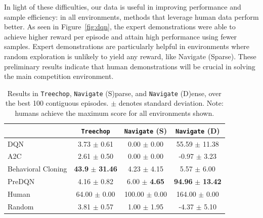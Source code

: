 In light of these difficulties, our data is useful in improving performance and sample efficiency:
in all environments, methods that leverage human data perform better.
As seen in Figure~\ref{fig:dqn}, the expert demonstrations were able to achieve higher
reward per episode and attain high performance using fewer samples.
Expert demonstrations are particularly helpful in environments where random exploration 
is unlikely to yield any reward, like Navigate (Sparse). These preliminary results indicate that human demonstrations will be crucial in solving the main competition environment.



\begin{table}
    \small
    \centering
            \begin{tabular}{lccc}
                \toprule
                  & \texttt{Treechop} & \texttt{Navigate} (S) & \texttt{Navigate} (D) \\
                  \midrule
                 DQN \cite{mnih2015human}& 3.73 $\pm$ 0.61 & 0.00 $\pm$ 0.00 & 55.59 $\pm$ 11.38 \\
                 A2C \cite{mnih2016asynchronous}& 2.61 $\pm$ 0.50 & 0.00 $\pm$ 0.00 & -0.97 $\pm$ 3.23 \\
                 Behavioral Cloning & \textbf{43.9} $\pm$ \textbf{31.46} & 4.23 $\pm$ 4.15 & 5.57 $\pm$ 6.00 \\
                PreDQN & {4.16} $\pm$ {0.82} & {6.00} $\pm$ \textbf{4.65} & \textbf{94.96} $\pm$ \textbf{13.42} \\
                \midrule
                Human & 64.00 $\pm$ 0.00 & 100.00 $\pm$ 0.00 & 164.00 $\pm$ 0.00 \\
                Random & 3.81 $\pm$ 0.57 & 1.00 $\pm$ 1.95 & -4.37 $\pm$ 5.10 \\
                \bottomrule
            \end{tabular}
    \caption{
        \small Results in \texttt{Treechop}, \texttt{Navigate} (S)parse, and \texttt{Navigate} (D)ense, over the best 100 contiguous episodes. $\pm$ denotes standard deviation. 
        Note: humans achieve the maximum score for all environments shown.
    }
    \label{table:perf}
    \vspace{0pt}
\end{table}


